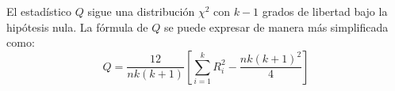 El estadístico \( Q \) sigue una distribución \( \chi^2 \) con \( k-1 \) grados de libertad bajo la hipótesis nula. La fórmula de \( Q \) se puede expresar de manera más simplificada como:
   \[
   Q = \frac{12}{nk(k+1)} \left[ \sum_{i=1}^{k} R_i^2 - \frac{nk(k+1)^2}{4} \right]
   \]






